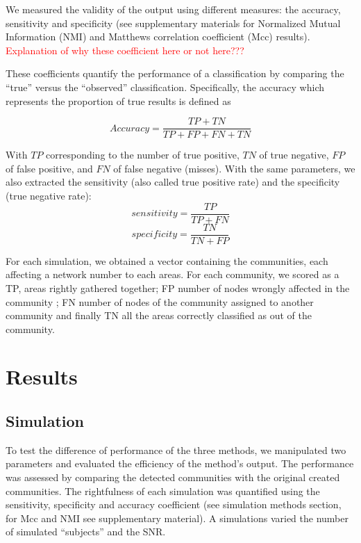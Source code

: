 We measured the validity of the output using different measures: the accuracy, sensitivity and specificity (see supplementary materials for Normalized Mutual Information (NMI) and Matthews correlation coefficient (Mcc) results). \\
\textcolor{red}{Explanation of why these coefficient here or not here???}

 These coefficients quantify the performance of a classification by comparing the “true” versus the “observed” classification. 
 Specifically, the accuracy which represents the proportion of true results is defined as

   \begin{equation}
   Accuracy= \frac{TP+TN}{TP+FP+FN+TN}
   \end{equation}
   
With $TP$ corresponding to the number of true positive, $TN$ of true negative, $FP$ of false positive, and $FN$ of false negative (misses).
With the same parameters, we also extracted the sensitivity (also called true positive rate) and the specificity (true negative rate):
 \begin{equation}
 sensitivity=\frac{TP}{TP+FN}
 \end{equation}
  \begin{equation}
 specificity=\frac{TN}{TN+FP}
 \end{equation}

For each simulation, we obtained a vector containing the communities, each affecting a network number to each areas. For each community, we scored as a TP, areas rightly gathered together; FP number of nodes wrongly affected in the community ; FN number of nodes of the community assigned to another community and finally TN all the areas correctly classified as out of the community. 

\section{Results}
\subsection{Simulation}
To test the difference of performance of the three methods, we
manipulated two parameters and evaluated the efficiency  of  the  method’s  output.  The  performance  was assessed by comparing the detected communities with the original created communities. The
rightfulness of each simulation was quantified using the sensitivity, specificity and accuracy coefficient (see simulation methods section, for Mcc and NMI see supplementary material).
A simulations varied the number
of simulated “subjects” and the SNR. 

